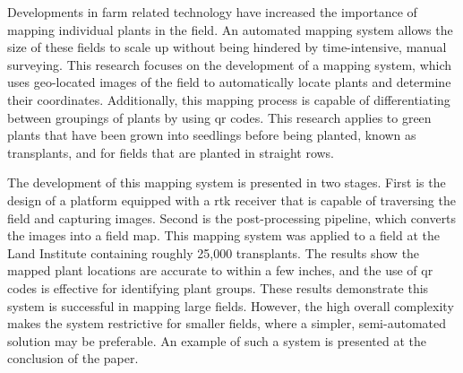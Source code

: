 
\pagestyle{empty}
\setlength{\baselineskip}{0.8cm}




Developments in farm related technology have increased the importance of mapping individual plants in the field.  An automated mapping system allows the size of these fields to scale up without being hindered by time-intensive, manual surveying.  This research focuses on the development of a mapping system, which uses geo-located images of the field to automatically locate plants and determine their coordinates.  Additionally, this mapping process is capable of differentiating between groupings of plants by using \ac{qr} codes.  This research applies to green plants that have been grown into seedlings before being planted, known as transplants, and for fields that are planted in straight rows. 

The development of this mapping system is presented in two stages.  First is the design of a platform equipped with a \ac{rtk} receiver that is capable of traversing the field and capturing images. Second is the post-processing pipeline, which converts the images into a field map.  This mapping system was applied to a field at the Land Institute containing roughly 25,000 transplants. The results show the mapped plant locations are accurate to within a few inches, and the use of \ac{qr} codes is effective for identifying plant groups.  These results demonstrate this system is successful in mapping large fields.  However, the high overall complexity makes the system restrictive for smaller fields, where a simpler, semi-automated solution may be preferable. An example of such a system is presented at the conclusion of the paper.
